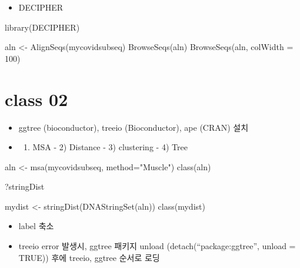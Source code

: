 \documentclass[
]{book}
\newenvironment{Shaded}{\begin{snugshade}}{\end{snugshade}}
\newcommand{\AttributeTok}[1]{\textcolor[rgb]{0.77,0.63,0.00}{#1}}
\newcommand{\DecValTok}[1]{\textcolor[rgb]{0.00,0.00,0.81}{#1}}
\newcommand{\FunctionTok}[1]{\textcolor[rgb]{0.00,0.00,0.00}{#1}}
\newcommand{\NormalTok}[1]{#1}
\newcommand{\OtherTok}[1]{\textcolor[rgb]{0.56,0.35,0.01}{#1}}
\newcommand{\StringTok}[1]{\textcolor[rgb]{0.31,0.60,0.02}{#1}}
\providecommand{\tightlist}{%
  \setlength{\itemsep}{0pt}\setlength{\parskip}{0pt}}
\begin{document}
\begin{itemize}
\tightlist
\item
  DECIPHER
\end{itemize}

\begin{Shaded}
\begin{Highlighting}[]
\FunctionTok{library}\NormalTok{(DECIPHER)}

\NormalTok{aln }\OtherTok{\textless{}{-}} \FunctionTok{AlignSeqs}\NormalTok{(mycovidsubseq)}
\FunctionTok{BrowseSeqs}\NormalTok{(aln)}
\FunctionTok{BrowseSeqs}\NormalTok{(aln, }\AttributeTok{colWidth =} \DecValTok{100}\NormalTok{)}
\end{Highlighting}
\end{Shaded}

\hypertarget{class-02-4}{%
\section{class 02}\label{class-02-4}}

\begin{itemize}
\item
  ggtree (bioconductor), treeio (Bioconductor), ape (CRAN) 설치
\item
  \begin{enumerate}
  \def\labelenumi{\arabic{enumi})}
  \tightlist
  \item
    MSA - 2) Distance - 3) clustering - 4) Tree
  \end{enumerate}
\end{itemize}

\begin{Shaded}
\begin{Highlighting}[]

\NormalTok{aln }\OtherTok{\textless{}{-}} \FunctionTok{msa}\NormalTok{(mycovidsubseq, }\AttributeTok{method=}\StringTok{"Muscle"}\NormalTok{)}
\FunctionTok{class}\NormalTok{(aln)}

\NormalTok{?stringDist}

\NormalTok{mydist }\OtherTok{\textless{}{-}} \FunctionTok{stringDist}\NormalTok{(}\FunctionTok{DNAStringSet}\NormalTok{(aln))}
\FunctionTok{class}\NormalTok{(mydist)}
\end{Highlighting}
\end{Shaded}

\begin{itemize}
\tightlist
\item
  label 축소
\item
  treeio error 발생시, ggtree 패키지 unload (detach(``package:ggtree'', unload = TRUE)) 후에 treeio, ggtree 순서로 로딩
\end{itemize}
\end{document}

